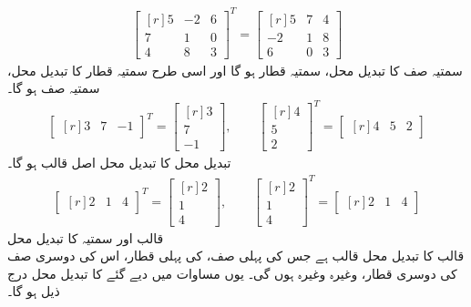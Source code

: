 \begin{align*}
\begin{bmatrix*}[r] 5&-2&6\\7&1&0\\4&8&3 \end{bmatrix*}^T=\begin{bmatrix*}[r] 5&7&4\\-2&1&8\\6&0&3\end{bmatrix*}
\end{align*}
سمتیہ صف کا تبدیل محل، سمتیہ قطار ہو گا اور اسی طرح سمتیہ قطار کا تبدیل محل، سمتیہ صف ہو گا۔
\begin{align*}
\begin{bmatrix*}[r] 3&7&-1 \end{bmatrix*}^T=\begin{bmatrix*}[r] 3\\7\\-1 \end{bmatrix*}, \quad\quad \begin{bmatrix*}[r] 4\\5\\2\end{bmatrix*}^T=\begin{bmatrix*}[r] 4&5&2 \end{bmatrix*}
\end{align*}
تبدیل محل کا تبدیل محل اصل قالب ہو گا۔
\begin{align*}
\begin{bmatrix*}[r] 2&1&4 \end{bmatrix*}^T=\begin{bmatrix*}[r] 2\\1\\4\end{bmatrix*}, \quad\quad \begin{bmatrix*}[r]2\\1\\4\end{bmatrix*}^T=\begin{bmatrix*}[r] 2&1&4 \end{bmatrix*}
\end{align*}
\quad قالب اور سمتیہ کا تبدیل محل\\
 قالب  کا تبدیل محل  قالب  ہے جس کی پہلی  صف،  کی  پہلی قطار، اس کی دوسری صف  کی دوسری قطار، وغیرہ وغیرہ ہوں گی۔ یوں مساوات  میں دیے گئے  کا تبدیل محل  درج ذیل ہو گا۔

